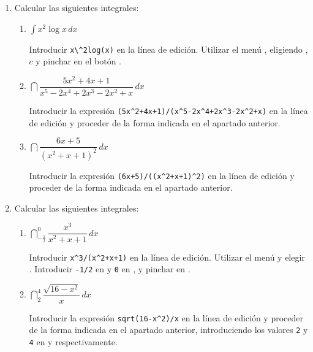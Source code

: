 \begin{enumerate}[leftmargin=*]
\item Calcular las siguientes integrales:
\begin{enumerate}
\item $ \int{x^{2} \log{x}\,dx}$
\begin{indicacion}
Introducir \verb|x\^2log(x)| en la línea de edición. Utilizar el menú , eligiendo ,
 $c$ y pinchar en el botón .
\end{indicacion}

\item $ \dint{\dfrac{5x^{2}+4x+1}{x^{5}-2x^{4}+2x^{3}-2x^{2}+x}\,dx}$
\begin{indicacion}
Introducir la expresión \verb|(5x^2+4x+1)/(x^5-2x^4+2x^3-2x^2+x)| en la línea de edición y proceder de la forma indicada en el apartado
anterior.
\end{indicacion}

\item $ \dint{\dfrac{6x+5}{(x^{2}+x+1)^{2}}\,dx}$
\begin{indicacion}
Introducir la expresión \verb|(6x+5)/((x^2+x+1)^2)| en la línea de edición y proceder de la forma indicada en el apartado anterior.
\end{indicacion}
\end{enumerate}


\item Calcular las siguientes integrales:
\begin{enumerate}
\item $ \dint^{0}_{-\frac{1}{2}}{\dfrac{x^{3}}{x^{2}+x+1}}\,dx$
\begin{indicacion}
Introducir \verb|x^3/(x^2+x+1)| en la línea de edición. 
Utilizar el menú  y elegir .
Introducir \verb|-1/2| en  y \verb|0| en , y pinchar en .
\end{indicacion}

\item $ \dint^{4}_{2}{\dfrac{\sqrt{16-x^{2}}}{x}\,dx}$
\begin{indicacion}
Introducir la expresión \verb|sqrt(16-x^2)/x| en la línea de edición y proceder de la forma indicada en el apartado anterior,
introduciendo los valores \verb|2| y \verb|4| en  y  respectivamente.
\end{indicacion}


\end{enumerate}
\end{enumerate}
